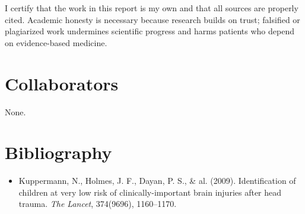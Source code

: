 \documentclass[10pt,letterpaper]{article}
\begin{document}
I certify that the work in this report is my own and that all sources are properly cited. Academic honesty is necessary because research builds on trust; falsified or plagiarized work undermines scientific progress and harms patients who depend on evidence-based medicine.

\section{Collaborators}\label{collaborators}

None.

\section{Bibliography}\label{bibliography}

\begin{itemize}
\item Kuppermann, N., Holmes, J. F., Dayan, P. S., \& al. (2009). Identification of children at very low risk of clinically-important brain injuries after head trauma. \textit{The Lancet}, 374(9696), 1160--1170.
\end{itemize}
\end{document}
